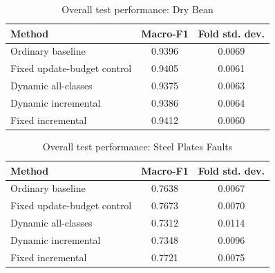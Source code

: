 \begin{table}[t]
\caption{Overall test performance: Dry Bean}
\label{tab:dry-bean-overall}
\centering
\begin{tabular}{lcc}
\toprule Method & Macro-F1 & Fold std. dev.\\
\midrule
Ordinary baseline & 0.9396 & 0.0069\\
Fixed update-budget control & 0.9405 & 0.0061\\
Dynamic all-classes & 0.9375 & 0.0063\\
Dynamic incremental & 0.9386 & 0.0064\\
Fixed incremental & 0.9412 & 0.0060\\
\bottomrule
\end{tabular}
\end{table}
\begin{table}[t]
\caption{Overall test performance: Steel Plates Faults}
\label{tab:steel-plates-overall}
\centering
\begin{tabular}{lcc}
\toprule Method & Macro-F1 & Fold std. dev.\\
\midrule
Ordinary baseline & 0.7638 & 0.0067\\
Fixed update-budget control & 0.7673 & 0.0070\\
Dynamic all-classes & 0.7312 & 0.0114\\
Dynamic incremental & 0.7348 & 0.0096\\
Fixed incremental & 0.7721 & 0.0075\\
\bottomrule
\end{tabular}
\end{table}
